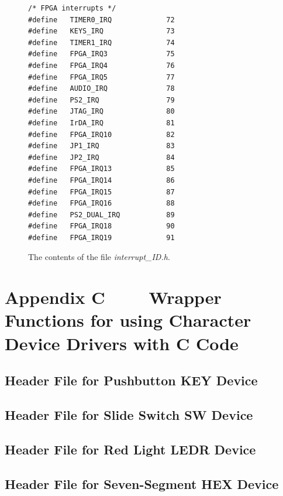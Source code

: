 \documentclass[11pt, twoside, pdftex]{article}
\begin{document}
\lstset{language=C,numbers=none}
\begin{figure}[H]
\begin{center}
\begin{minipage}[t]{16 cm}
\begin{lstlisting}
/* FPGA interrupts */
#define   TIMER0_IRQ             72
#define   KEYS_IRQ               73
#define   TIMER1_IRQ             74
#define   FPGA_IRQ3              75
#define   FPGA_IRQ4              76
#define   FPGA_IRQ5              77
#define   AUDIO_IRQ              78
#define   PS2_IRQ                79
#define   JTAG_IRQ               80
#define   IrDA_IRQ               81
#define   FPGA_IRQ10             82
#define   JP1_IRQ                83
#define   JP2_IRQ                84
#define   FPGA_IRQ13             85
#define   FPGA_IRQ14             86
#define   FPGA_IRQ15             87
#define   FPGA_IRQ16             88
#define   PS2_DUAL_IRQ           89
#define   FPGA_IRQ18             90
#define   FPGA_IRQ19             91
\end{lstlisting}
\end{minipage}
\end{center}
\caption{The contents of the file {\it interrupt\_ID.h}.}
\label{fig:interrupts}
\end{figure}

\newpage
\section*{Appendix C~~~~ Wrapper Functions for using Character Device Drivers with C Code}

\subsection*{Header File for Pushbutton KEY Device}
\lstset{language=C,numbers=none}

\newpage
\subsection*{Header File for Slide Switch SW Device}

\newpage
\subsection*{Header File for Red Light LEDR Device}

\newpage
\subsection*{Header File for Seven-Segment HEX Device}

\newpage
\end{document}
